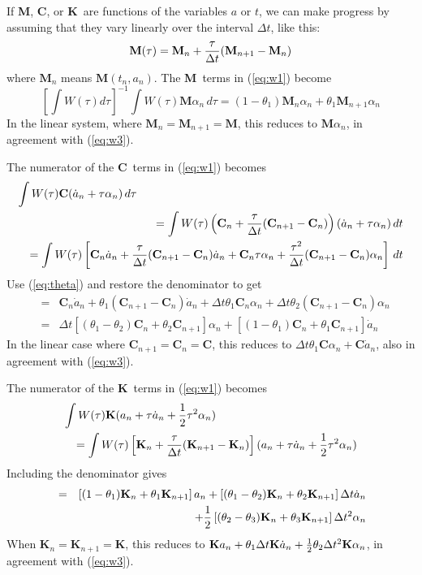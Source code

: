 \documentclass[onecolumn,prl,floatfix,12pt]{revtex4}
\newcommand{\M}{\textbf{M}}
\newcommand{\C}{\textbf{C}}
\newcommand{\K}{\textbf{K}}
\newcommand{\half}{{1\over2}}
\begin{document}
If \M, \C, or \K\ are functions of the variables $a$ or $t$, we can
make progress by assuming that they vary linearly over the interval
$\Delta t$, like this:
\begin{equation}
  \label{eq:Mexp}
  \M(\tau) = \M_n + {\tau\over\Delta t}(\M_{n+1} - \M_n)
\end{equation}
where $\M_n$ means $\M(t_n, a_n)$.  The \M\ terms in (\ref{eq:w1})
become
\begin{equation}
  \label{eq:m1}
  \left[\int W(\tau)d\tau\right]^{-1}\int W(\tau)\M\alpha_n\,d\tau =
  (1-\theta_1)\M_n\alpha_n + \theta_1\M_{n+1}\alpha_n
\end{equation}
In the linear system, where $\M_n = \M_{n+1} = \M$, this reduces to
$\M\alpha_n$, in agreement with (\ref{eq:w3}).

The numerator of the \C\ terms in (\ref{eq:w1}) becomes
\begin{eqnarray}
  \lefteqn{\int W(\tau)\C(\dot a_n + \tau\alpha_n)\,d\tau}\nonumber \\
  &&= \int W(\tau)\left(\C_n + {\tau\over\Delta t}(\C_{n+1} - \C_n)\right)
  (\dot a_n + \tau\alpha_n)\,dt \\
&&= \int W(\tau)\left[\C_n\dot a_n + 
  {\tau\over\Delta t}(\C_{n+1}-\C_n)\dot a_n
  + \C_n\tau\alpha_n + {\tau^2\over\Delta t}(\C_{n+1}-\C_n)\alpha_n\right]\, dt
\end{eqnarray}
Use (\ref{eq:theta}) and restore the denominator to get
\begin{eqnarray}
  &=& \C_n\dot a_n + \theta_1(\C_{n+1}-\C_n)\dot a_n +
  \Delta t\theta_1\C_n\alpha_n + \Delta t\theta_2(\C_{n+1}-\C_n)\alpha_n \\
  &=& 
  \label{eq:Cexp}
  \Delta t\left[(\theta_1-\theta_2)\C_n + \theta_2\C_{n+1}\right]\alpha_n
  + \left[(1-\theta_1)\C_n+ \theta_1\C_{n+1}\right]\dot a_n
\end{eqnarray}
In the linear case where $\C_{n+1} = \C_n = \C$, this reduces to
$\Delta t\theta_1\C\alpha_n + \C\dot a_n$, also in agreement with
(\ref{eq:w3}).

The numerator of the \K\ terms in (\ref{eq:w1}) becomes
\begin{eqnarray}
  \lefteqn{\int W(\tau)\K(a_n + \tau\dot a_n + \half\tau^2\alpha_n)}\nonumber \\
  &&= \int W(\tau)
  \left[\K_n + {\tau\over\Delta t} (\K_{n+1} - \K_n)\right]
    (a_n + \tau\dot a_n + \half\tau^2\alpha_n)
\end{eqnarray}
Including the denominator gives
\begin{eqnarray}
  \label{eq:Kexp}
  &=& \left[(1-\theta_1)\K_n + \theta_1\K_{n+1}\right]a_n
  + \left[(\theta_1-\theta_2)\K_n + \theta_2\K_{n+1}\right]\Delta t\dot a_n\\
  &&\qquad +\half \left[(\theta_2-\theta_3)\K_n + \theta_3\K_{n+1}\right]
  \Delta t^2\alpha_n \nonumber
\end{eqnarray}
When $\K_n = \K_{n+1}=\K$, this reduces to $\K a_n + \theta_1\Delta
t\K\dot a_n + \half\theta_2\Delta t^2\K\alpha_n$, in agreement with
(\ref{eq:w3}).
\end{document}
